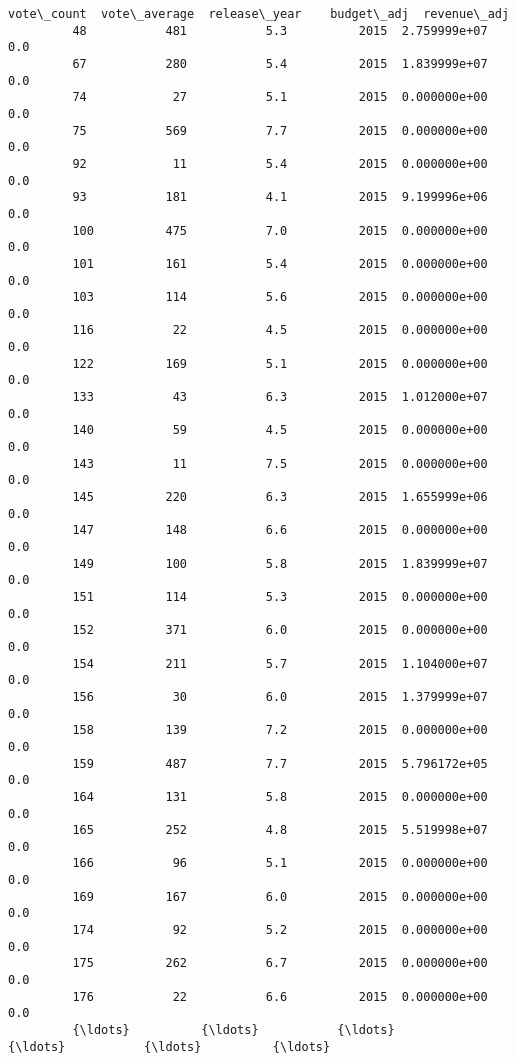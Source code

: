 \documentclass[11pt]{article}
\begin{document}
\begin{Verbatim}[commandchars=\\\{\}]
               vote\_count  vote\_average  release\_year    budget\_adj  revenue\_adj  
         48           481           5.3          2015  2.759999e+07          0.0  
         67           280           5.4          2015  1.839999e+07          0.0  
         74            27           5.1          2015  0.000000e+00          0.0  
         75           569           7.7          2015  0.000000e+00          0.0  
         92            11           5.4          2015  0.000000e+00          0.0  
         93           181           4.1          2015  9.199996e+06          0.0  
         100          475           7.0          2015  0.000000e+00          0.0  
         101          161           5.4          2015  0.000000e+00          0.0  
         103          114           5.6          2015  0.000000e+00          0.0  
         116           22           4.5          2015  0.000000e+00          0.0  
         122          169           5.1          2015  0.000000e+00          0.0  
         133           43           6.3          2015  1.012000e+07          0.0  
         140           59           4.5          2015  0.000000e+00          0.0  
         143           11           7.5          2015  0.000000e+00          0.0  
         145          220           6.3          2015  1.655999e+06          0.0  
         147          148           6.6          2015  0.000000e+00          0.0  
         149          100           5.8          2015  1.839999e+07          0.0  
         151          114           5.3          2015  0.000000e+00          0.0  
         152          371           6.0          2015  0.000000e+00          0.0  
         154          211           5.7          2015  1.104000e+07          0.0  
         156           30           6.0          2015  1.379999e+07          0.0  
         158          139           7.2          2015  0.000000e+00          0.0  
         159          487           7.7          2015  5.796172e+05          0.0  
         164          131           5.8          2015  0.000000e+00          0.0  
         165          252           4.8          2015  5.519998e+07          0.0  
         166           96           5.1          2015  0.000000e+00          0.0  
         169          167           6.0          2015  0.000000e+00          0.0  
         174           92           5.2          2015  0.000000e+00          0.0  
         175          262           6.7          2015  0.000000e+00          0.0  
         176           22           6.6          2015  0.000000e+00          0.0  
         {\ldots}          {\ldots}           {\ldots}           {\ldots}           {\ldots}          {\ldots}  

\end{Verbatim}
\end{document}
